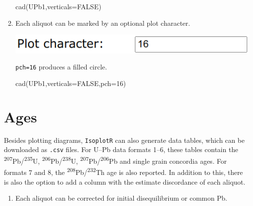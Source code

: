 \begin{refsection}
\begin{enumerate}
\begin{console}
cad(UPb1,verticals=FALSE)
\end{console}

\item Each aliquot can be marked by an optional plot character.

\noindent\begin{minipage}[t]{.4\linewidth}
\strut\vspace*{-\baselineskip}\newline
\includegraphics[width=\linewidth]{../figures/UPbCADpch.png}
\end{minipage}
\begin{minipage}[t]{.6\linewidth}
  \texttt{pch=16} produces a filled circle.
\end{minipage}

\begin{console}
cad(UPb1,verticals=FALSE,pch=16)
\end{console}

\end{enumerate}

\section{Ages}\label{sec:UPbAges}

Besides plotting diagrams, \texttt{IsoplotR} can also generate data
tables, which can be downloaded as \texttt{.csv} files. For U--Pb data
formats 1--6, these tables contain the
\textsuperscript{207}Pb/\textsuperscript{235}U,
\textsuperscript{206}Pb/\textsuperscript{238}U,
\textsuperscript{207}Pb/\textsuperscript{206}Pb and single grain
concordia ages. For formats 7 and 8, the
\textsuperscript{208}Pb/\textsuperscript{232}Th age is also reported.
In addition to this, there is also the option to add a column with the
estimate discordance of each aliquot.

\begin{enumerate}

\item Each aliquot can be corrected for initial disequilibrium or
  common Pb.


\end{enumerate}
\end{refsection}

